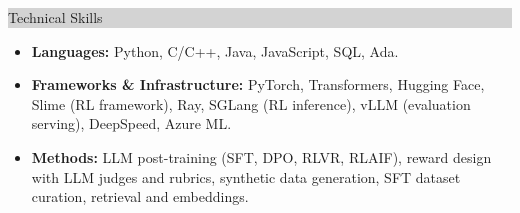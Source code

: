 \documentclass{article} %
\newcommand{\rsection}[1]{
  \hspace{-0.4cm}\vspace{0.1cm}
\colorbox{lightgrey}{
\begin{minipage}{1.07\linewidth}
\vspace{0.22cm}
\fontsize{14pt}{16pt}\selectfont #1
\vspace{0.12cm}
\end{minipage}
}
\par\nopagebreak %
}
\begin{document}
\vspace{0.05cm}
\rsection{Technical Skills}
\hspace*{-0.1cm}
\begin{minipage}{1.01\linewidth}
\begin{itemize}[label={},itemindent=-2em,leftmargin=2em,parsep=1pt,itemsep=0pt,topsep=3pt]
  \item \textbf{Languages:} Python, C/C++, Java, JavaScript, SQL, Ada.
  \item \textbf{Frameworks \& Infrastructure:} PyTorch, Transformers, Hugging Face, Slime (RL framework), Ray, SGLang (RL inference), vLLM (evaluation serving), DeepSpeed, Azure ML.
  \item \textbf{Methods:} LLM post-training (SFT, DPO, RLVR, RLAIF), reward design with LLM judges and rubrics, synthetic data generation, SFT dataset curation, retrieval and embeddings.
  \end{itemize}
\end{minipage}
\end{document}
